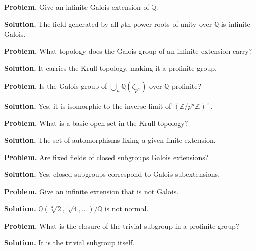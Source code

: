 \begin{example}\label{ex:sec11-1}
\textbf{Problem.} Give an infinite Galois extension of $\mathbb{Q}$.

\textbf{Solution.} The field generated by all $p$th-power roots of unity over $\mathbb{Q}$ is infinite Galois.
\end{example}

\begin{example}\label{ex:sec11-2}
\textbf{Problem.} What topology does the Galois group of an infinite extension carry?

\textbf{Solution.} It carries the Krull topology, making it a profinite group.
\end{example}

\begin{example}\label{ex:sec11-3}
\textbf{Problem.} Is the Galois group of $\bigcup_{n} \mathbb{Q}(\zeta_{p^n})$ over $\mathbb{Q}$ profinite?

\textbf{Solution.} Yes, it is isomorphic to the inverse limit of $(\mathbb{Z}/p^n\mathbb{Z})^\times$.
\end{example}

\begin{example}\label{ex:sec11-4}
\textbf{Problem.} What is a basic open set in the Krull topology?

\textbf{Solution.} The set of automorphisms fixing a given finite extension.
\end{example}

\begin{example}\label{ex:sec11-5}
\textbf{Problem.} Are fixed fields of closed subgroups Galois extensions?

\textbf{Solution.} Yes, closed subgroups correspond to Galois subextensions.
\end{example}

\begin{example}\label{ex:sec11-6}
\textbf{Problem.} Give an infinite extension that is not Galois.

\textbf{Solution.} $\mathbb{Q}(\sqrt[3]{2},\sqrt[3]{4},\dots)/\mathbb{Q}$ is not normal.
\end{example}

\begin{example}\label{ex:sec11-7}
\textbf{Problem.} What is the closure of the trivial subgroup in a profinite group?

\textbf{Solution.} It is the trivial subgroup itself.
\end{example}


